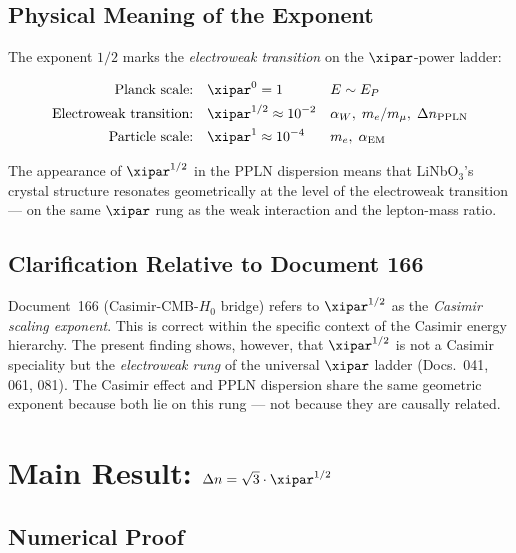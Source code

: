 \subsection{Physical Meaning of the Exponent}

The exponent $1/2$ marks the \emph{electroweak transition} on the
$\xipar$-power ladder:

\begin{align}
    \text{Planck scale:}\quad          & \xipar^0     = 1
        && E \sim E_P \notag \\
    \text{Electroweak transition:}\quad & \xipar^{1/2} \approx 10^{-2}
        && \alpha_W,\; m_e/m_\mu,\; \Delta n_\text{PPLN}
        \label{eq:rung} \\
    \text{Particle scale:}\quad        & \xipar^1     \approx 10^{-4}
        && m_e,\; \alpha_\mathrm{EM} \notag
\end{align}

The appearance of $\xipar^{1/2}$ in the PPLN dispersion means that
LiNbO$_3$'s crystal structure resonates geometrically at the level of
the electroweak transition — on the same $\xipar$ rung as the weak
interaction and the lepton-mass ratio.

\subsection{Clarification Relative to Document 166}

Document~166 (Casimir-CMB-$H_0$ bridge) refers to $\xipar^{1/2}$ as the
\emph{Casimir scaling exponent}. This is correct within the specific context
of the Casimir energy hierarchy. The present finding shows, however, that
$\xipar^{1/2}$ is not a Casimir speciality but the \emph{electroweak rung}
of the universal $\xipar$ ladder (Docs.~041, 061, 081). The Casimir effect
and PPLN dispersion share the same geometric exponent because both lie on
this rung — not because they are causally related.

\clearpage

\section{Main Result: \texorpdfstring{$\Delta n = \sqrt{3}\cdot\xipar^{1/2}$}{%
  Delta n = sqrt(3) xi\^{}(1/2)}}
\label{sec:main_result}

\subsection{Numerical Proof}

